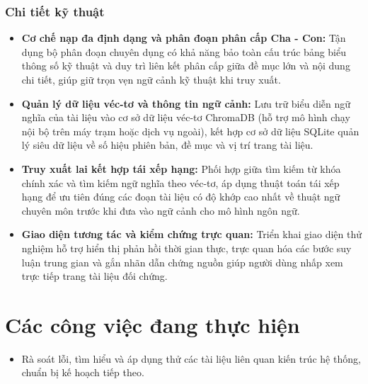 \subsubsection{Chi tiết kỹ thuật}
\begin{itemize}
    \item \textbf{Cơ chế nạp đa định dạng và phân đoạn phân cấp Cha - Con:} Tận dụng bộ phân đoạn chuyên dụng có khả năng bảo toàn cấu trúc bảng biểu thông số kỹ thuật và duy trì liên kết phân cấp giữa đề mục lớn và nội dung chi tiết, giúp giữ trọn vẹn ngữ cảnh kỹ thuật khi truy xuất.
    \item \textbf{Quản lý dữ liệu véc-tơ và thông tin ngữ cảnh:} Lưu trữ biểu diễn ngữ nghĩa của tài liệu vào cơ sở dữ liệu véc-tơ ChromaDB (hỗ trợ mô hình chạy nội bộ trên máy trạm hoặc dịch vụ ngoài), kết hợp cơ sở dữ liệu SQLite quản lý siêu dữ liệu về số hiệu phiên bản, đề mục và vị trí trang tài liệu.
    \item \textbf{Truy xuất lai kết hợp tái xếp hạng:} Phối hợp giữa tìm kiếm từ khóa chính xác và tìm kiếm ngữ nghĩa theo véc-tơ, áp dụng thuật toán tái xếp hạng để ưu tiên đúng các đoạn tài liệu có độ khớp cao nhất về thuật ngữ chuyên môn trước khi đưa vào ngữ cảnh cho mô hình ngôn ngữ.
    \item \textbf{Giao diện tương tác và kiểm chứng trực quan:} Triển khai giao diện thử nghiệm hỗ trợ hiển thị phản hồi thời gian thực, trực quan hóa các bước suy luận trung gian và gắn nhãn dẫn chứng nguồn giúp người dùng nhấp xem trực tiếp trang tài liệu đối chứng.
\end{itemize}

\section{Các công việc đang thực hiện}
\begin{itemize}
    \item Rà soát lỗi, tìm hiểu và áp dụng thử các tài liệu liên quan kiến trúc hệ thống, chuẩn bị kế hoạch tiếp theo.
\end{itemize}
